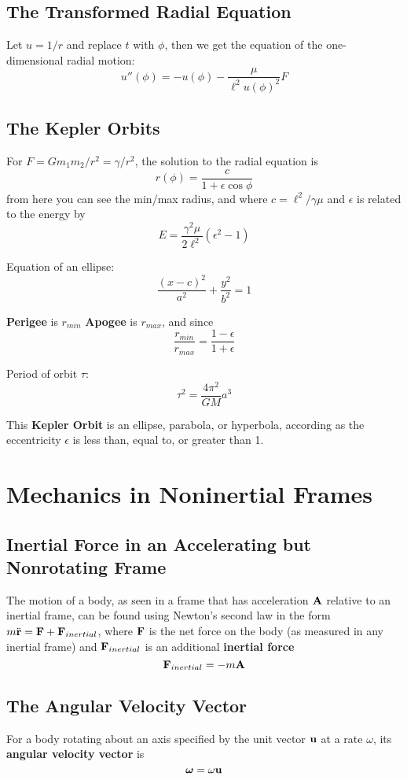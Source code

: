 \documentclass{article}
\begin{document}
\subsection*{The Transformed Radial Equation}
Let $u = 1/r$ and replace $t$ with $\phi$, then we get the equation of the one-dimensional radial motion:
$$
u''(\phi) = -u(\phi) - \frac{\mu}{\ell^2 u(\phi)^2} F
$$
\subsection*{The Kepler Orbits}
For $F = Gm_1 m_2/r^2 = \gamma/r^2$, the solution to the radial equation is
$$
r(\phi) = \frac{c}{1+\epsilon\cos\phi}
$$
from here you can see the min/max radius, and where $c = \ell^2/\gamma\mu$ and $\epsilon$ is related to the energy by 
$$
E = \frac{\gamma^2 \mu}{2 \ell^2}(\epsilon^2 - 1)
$$

Equation of an ellipse:
$$
\frac{(x-c)^2}{a^2} + \frac{y^2}{b^2} = 1
$$

\textbf{Perigee} is $r_{min}$ \textbf{Apogee} is $r_{max}$, and since 
$$
\frac{r_{min}}{r_{max}} = \frac{1-\epsilon}{1+\epsilon}
$$

Period of orbit $\tau$:
$$
\tau^2 = \frac{4\pi^2}{GM} a^3
$$

This \textbf{Kepler Orbit} is an ellipse, parabola, or hyperbola, according as the eccentricity $\epsilon$ is less than, equal to, or greater than 1.

\section{Mechanics in Noninertial Frames}
\subsection*{Inertial Force in an Accelerating but Nonrotating Frame}
The motion of a body, as seen in a frame that has acceleration $\vb{A}$ relative to an inertial frame, can be found using Newton's second law in the form $ m \ddot{\vb{r}} = \vb{F} + \vb{F}_{inertial}$, where $\vb{F}$ is the net force on the body (as measured in any inertial frame) and $\vb{F}_{inertial}$ is an additional \textbf{inertial force}
$$
\vb{F}_{inertial} = -m\vb{A}
$$
\subsection*{The Angular Velocity Vector}
For a body rotating about an axis specified by the unit vector $\vb{u}$ at a rate $\omega$, its \textbf{angular velocity vector} is
$$
\bm{\omega} = \omega \vb{u}
$$
\end{document}
